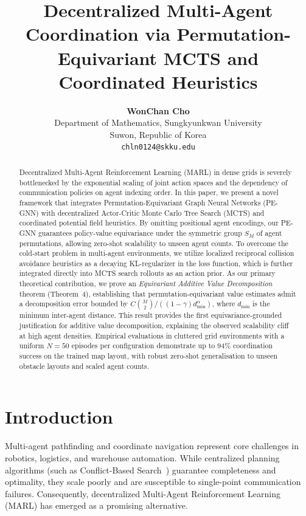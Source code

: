 \documentclass[11pt,a4paper]{article}
\title{\LARGE \bf
Decentralized Multi-Agent Coordination via Permutation-Equivariant MCTS and Coordinated Heuristics
}
\author{
  \textbf{WonChan Cho} \\
  Department of Mathematics, Sungkyunkwan University \\
  Suwon, Republic of Korea \\
  \texttt{chln0124@skku.edu}
}
\begin{document}
\maketitle
\thispagestyle{empty}
\pagestyle{empty}

\begin{abstract}
Decentralized Multi-Agent Reinforcement Learning (MARL) in dense grids is severely bottlenecked by the exponential scaling of joint action spaces and the dependency of communication policies on agent indexing order. In this paper, we present a novel framework that integrates Permutation-Equivariant Graph Neural Networks (PE-GNN) with decentralized Actor-Critic Monte Carlo Tree Search (MCTS) and coordinated potential field heuristics. By omitting positional agent encodings, our PE-GNN guarantees policy-value equivariance under the symmetric group $S_M$ of agent permutations, allowing zero-shot scalability to unseen agent counts. To overcome the cold-start problem in multi-agent environments, we utilize localized reciprocal collision avoidance heuristics as a decaying KL-regularizer in the loss function, which is further integrated directly into MCTS search rollouts as an action prior. As our primary theoretical contribution, we prove an \emph{Equivariant Additive Value Decomposition} theorem (Theorem~4), establishing that permutation-equivariant value estimates admit a decomposition error bounded by $C\binom{M}{2}/((1-\gamma)d_{\min}^\alpha)$, where $d_{\min}$ is the minimum inter-agent distance. This result provides the first equivariance-grounded justification for additive value decomposition, explaining the observed scalability cliff at high agent densities. Empirical evaluations in cluttered grid environments with a uniform $N=50$ episodes per configuration demonstrate up to $94\%$ coordination success on the trained map layout, with robust zero-shot generalisation to unseen obstacle layouts and scaled agent counts.
\end{abstract}

\section{Introduction}
Multi-agent pathfinding and coordinate navigation represent core challenges in robotics, logistics, and warehouse automation. While centralized planning algorithms (such as Conflict-Based Search~\cite{sharon2015conflict}) guarantee completeness and optimality, they scale poorly and are susceptible to single-point communication failures. Consequently, decentralized Multi-Agent Reinforcement Learning (MARL) has emerged as a promising alternative.
\end{document}
